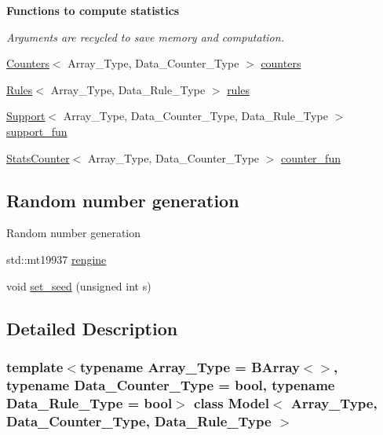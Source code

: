 \begin{Indent}\textbf{ Functions to compute statistics}\par
{\em Arguments are recycled to save memory and computation. }\begin{DoxyCompactItemize}
\item 
\hyperlink{class_counters}{Counters}$<$ Array\+\_\+\+Type, Data\+\_\+\+Counter\+\_\+\+Type $>$ \hyperlink{class_model_a3189eb46eed19f865ca0aa3f6b191c78}{counters}
\item 
\hyperlink{class_rules}{Rules}$<$ Array\+\_\+\+Type, Data\+\_\+\+Rule\+\_\+\+Type $>$ \hyperlink{class_model_a65b96a73f8dba8a00cc767753aaca22b}{rules}
\item 
\hyperlink{class_support}{Support}$<$ Array\+\_\+\+Type, Data\+\_\+\+Counter\+\_\+\+Type, Data\+\_\+\+Rule\+\_\+\+Type $>$ \hyperlink{class_model_aa9806f4bf7d9c935f37a31e67bbfbee4}{support\+\_\+fun}
\item 
\hyperlink{class_stats_counter}{Stats\+Counter}$<$ Array\+\_\+\+Type, Data\+\_\+\+Counter\+\_\+\+Type $>$ \hyperlink{class_model_a2bb5ec8af1a49bcb2da6c5f9f2374b15}{counter\+\_\+fun}
\end{DoxyCompactItemize}
\end{Indent}
\subsection*{Random number generation}
\label{_amgrp9e5d9cca94c03e04e66d088f8628d19b}%
Random number generation \begin{DoxyCompactItemize}
\item 
std\+::mt19937 \hyperlink{class_model_afe20e82dca653b99e481d64b394299a2}{rengine}
\item 
void \hyperlink{class_model_a5baf09853382529460889f15076bc64a}{set\+\_\+seed} (unsigned int s)
\end{DoxyCompactItemize}


\subsection{Detailed Description}
\subsubsection*{template$<$typename Array\+\_\+\+Type = B\+Array$<$$>$, typename Data\+\_\+\+Counter\+\_\+\+Type = bool, typename Data\+\_\+\+Rule\+\_\+\+Type = bool$>$\newline
class Model$<$ Array\+\_\+\+Type, Data\+\_\+\+Counter\+\_\+\+Type, Data\+\_\+\+Rule\+\_\+\+Type $>$}

